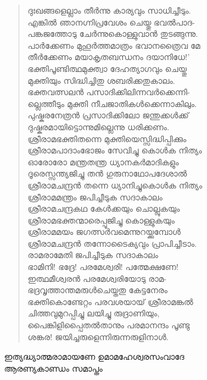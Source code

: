 \begin{verse}
ദുഃഖങ്ങളെല്ലാം തീര്‍ന്നു കാര്യവും സാധിച്ചീടും.\\
എങ്കില്‍ ഞാനഗ്നിപ്രവേശം ചെയ്തു ഭവല്‍പാദ-\\
പങ്കജത്തോടു ചേര്‍ന്നുകൊള്ളുവാന്‍ തുടങ്ങുന്നു.\\
പാര്‍ക്കേണം മുഹൂര്‍ത്തമാത്രം ഭവാനത്രൈവ മേ\\
തീര്‍ക്കേണം മയാകൃതബന്ധനം ദയാനിധേ!’\\
ഭക്തിപൂണ്ടിത്ഥമുക്ത്വാ ദേഹത്യാഗവും ചെയ്തു\\
മുക്തിയും സിദ്ധിച്ചിതു ശബരിക്കതുകാലം.\\
ഭക്തവത്സലന്‍ പസാദിക്കിലിന്നവര്‍ക്കെന്നി-\\
ല്ലെത്തീടും മുക്തി നീചജാതികള്‍ക്കെന്നാകിലും.\\
പുഷ്കരനേത്രന്‍ പ്രസാദിക്കിലോ ജന്തുക്കള്‍ക്ക്‍\\
ദുഷ്കരമായിട്ടൊന്നുമില്ലെന്നു ധരിക്കണം.\\
ശ്രീരാമഭക്തിതന്നെ മുക്തിയെസ്സിദ്ധിപ്പിക്കും\\
ശ്രീരാമപാദാംഭോജം സേവിച്ചു കൊള്‍ക നിത്യം\\
ഓരോരോ മന്ത്രതന്ത്ര ധ്യാനകര്‍മാദികളും\\
ദൂരെസ്സന്ത്യജിച്ചു തന്‍ ഗുരുനാഥോപദേശാല്‍\\
ശ്രീരാമചന്ദ്രന്‍ തന്നെ ധ്യാനിച്ചുകൊള്‍ക നിത്യം\\
ശ്രീരാമമന്ത്രം ജപിച്ചീടുക സദാകാലം\\
ശ്രീരാമചന്ദ്രകഥ കേള്‍ക്കയും ചൊല്ലുകയും\\
ശ്രീരാമഭക്തന്മാരെപ്പൂജിച്ചു കൊള്ളുകയും\\
ശ്രീരാമമയം ജഗത്സര്‍വമെന്നുറയ്ക്കുമ്പോള്‍\\
ശ്രീരാമചന്ദ്രന്‍ തന്നോടൈക്യവും പ്രാപിച്ചീടാം.\\
രാമരാമേതി ജപിച്ചീടുക സദാകാലം\\
ഭാമിനി! ഭദ്രേ! പരമേശ്വരി! പത്മേക്ഷണേ!\\
ഇത്ഥമീശ്വരന്‍ പരമേശ്വരിയോടു രാമ-\\
ഭദ്രവൃത്താന്തമരുള്‍ചെയ്തതു കേട്ടനേരം\\
ഭക്തികൊണ്ടേറ്റം പരവശയായ് ശ്രീരാമങ്കല്‍\\
ചിത്തവുമുറപ്പിച്ചു ലയിച്ചു രുദ്രാണിയും,\\
പൈങ്കിളിപ്പൈതല്‍താനും പരമാനന്ദം പൂണ്ടു\\
ശങ്കര! ജയിച്ചരുളെന്നിരുന്നരുളിനാള്‍.
\end{verse}

\begin{center}
ഇത്യദ്ധ്യാത്മരാമായണേ ഉമാമഹേശ്വരസംവാദേ\\
ആരണ്യകാണ്ഡം സമാപ്തം
\end{center}



